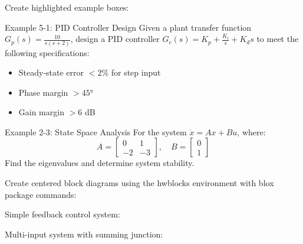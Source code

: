 \documentclass{../homework}
\begin{document}

Create highlighted example boxes:

\begin{example}{Example 5-1: PID Controller Design}
Given a plant transfer function $G_p(s) = \frac{10}{s(s+2)}$, design a PID controller 
$G_c(s) = K_p + \frac{K_i}{s} + K_d s$ to meet the following specifications:
\begin{itemize}
\item Steady-state error $< 2\%$ for step input
\item Phase margin $> 45°$
\item Gain margin $> 6$ dB
\end{itemize}
\end{example}

\begin{example}{Example 2-3: State Space Analysis}
For the system $\dot{x} = Ax + Bu$, where:
$$A = \begin{bmatrix} 0 & 1 \\ -2 & -3 \end{bmatrix}, \quad B = \begin{bmatrix} 0 \\ 1 \end{bmatrix}$$
Find the eigenvalues and determine system stability.
\end{example}


Create centered block diagrams using the hwblocks environment with blox package commands:

\subproblem
Simple feedback control system:

\begin{hwblocks}[scale=0.85]
\end{hwblocks}

\subproblem
Multi-input system with summing junction:

\begin{hwblocks}[scale=0.8]
\end{hwblocks}
\end{document}
